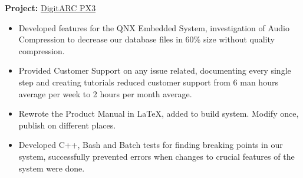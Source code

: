 \documentclass{scrartcl}
\begin{document}
\begin{minipage}[t]{0.69\textwidth}
	\textbf{Project:} \href{http://amige.com/meltshops_technological_controls_digitarc_px3.html}{DigitARC PX3}
	\begin{itemize}[noitemsep]
		\item Developed features for the QNX Embedded System, investigation of Audio Compression to decrease our database files in 60\% size without quality compression.
		\item Provided Customer Support on any issue related, documenting every single step and creating tutorials reduced customer support from 6 man hours average per week to 2 hours per month average.
	\item Rewrote the Product Manual in \LaTeX, added to build system. Modify once, publish on different places.
	\item Developed C++, Bash and Batch tests for finding breaking points in our system, successfully prevented errors when changes to crucial features of the system were done.
	\end{itemize}
\end{minipage}
\hfill
\end{document}
